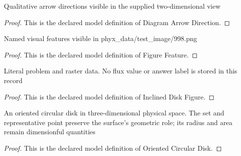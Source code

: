 \begin{definition}
  \label{def:physics:phyx-mini-0998:phyxminiproblems-problemphyxmini0998-diagramarrowdirection}
  Qualitative arrow directions visible in the supplied two-dimensional view
\end{definition}
\begin{proof}
  This is the declared model definition of Diagram Arrow Direction.
\end{proof}
\begin{definition}
  \label{def:physics:phyx-mini-0998:phyxminiproblems-problemphyxmini0998-figurefeature}
  Named visual features visible in phyx\_data/test\_image/998.png
\end{definition}
\begin{proof}
  This is the declared model definition of Figure Feature.
\end{proof}
\begin{definition}
  \label{def:physics:phyx-mini-0998:phyxminiproblems-problemphyxmini0998-inclineddiskfigure}
  Literal problem and raster data. No flux value or answer label is stored in this record
\end{definition}
\begin{proof}
  This is the declared model definition of Inclined Disk Figure.
\end{proof}
\begin{definition}
  \label{def:physics:phyx-mini-0998:phyxminiproblems-problemphyxmini0998-orientedcirculardisk}
  An oriented circular disk in three-dimensional physical space. The set and representative point preserve the surface's geometric role; its radius and area remain dimensionful quantities
\end{definition}
\begin{proof}
  This is the declared model definition of Oriented Circular Disk.
\end{proof}
